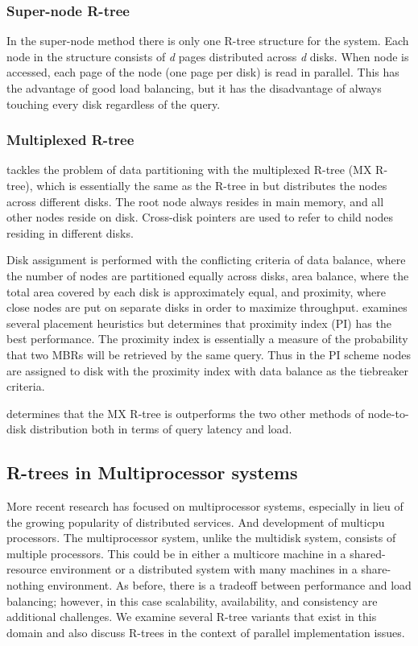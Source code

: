 \subsubsection{Super-node R-tree}
In the super-node method \cite{kamel1992parallel}\cite{thebook} there is only
one R-tree structure for the system. Each node in the structure consists of
\emph{d} pages distributed across \emph{d} disks. When node is accessed, each
page of the node (one page per disk) is read in parallel. This has the 
advantage of good load balancing, but it has the disadvantage of
always touching every disk regardless of the query.

\subsubsection{Multiplexed R-tree}
\cite{kamel1992parallel} tackles the problem of data partitioning with the 
multiplexed R-tree (MX R-tree), which is essentially the same as the R-tree 
in \cite{guttman84} but distributes the nodes across different disks. 
The root node always resides in main memory, and all other nodes reside on 
disk. Cross-disk pointers are used to refer to child nodes residing in 
different disks. 

Disk assignment is performed with the conflicting criteria of
data balance, where the number of nodes are partitioned equally across disks, 
area balance, where the total area covered by each disk is approximately 
equal, and proximity, where close nodes are put on separate disks in order to
maximize throughput. \cite{kamel1992parallel} examines several placement 
heuristics but determines that proximity index (PI) has the best performance. 
The proximity index is essentially a measure of the probability that two MBRs
will be retrieved by the same query. Thus in the PI scheme nodes are assigned 
to disk with the proximity index with data balance as the tiebreaker criteria.

\cite{kamel1992parallel} determines that the MX R-tree is outperforms the two
other methods of node-to-disk distribution both in terms of query latency and
load.
 
\subsection{R-trees in Multiprocessor systems}
More recent research has focused on multiprocessor systems, especially in 
lieu of the growing popularity of distributed services. And development of 
multicpu processors. 
The multiprocessor system, unlike the multidisk system, consists of multiple 
processors. This could be in either a multicore machine in a shared-resource
environment or a distributed system with many machines in a share-nothing 
environment. As before, there is a tradeoff between performance and load 
balancing; however, in this case scalability, availability, and consistency
are additional challenges. We examine several R-tree variants that exist in
this domain and also discuss R-trees in the context of parallel implementation
issues.

